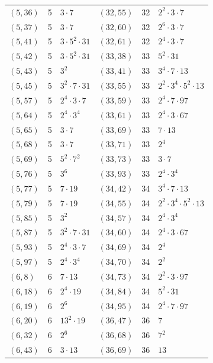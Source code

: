 \documentclass[11pt]{article}
\begin{document}
\begin{longtable}{@{}lrl@{\qquad}lrl@{}}
$(5,36)$ & 5 & $3\cdot 7$ & $(32,55)$ & 32 & $2^{2}\cdot 3\cdot 7$\\
$(5,37)$ & 5 & $3\cdot 7$ & $(32,60)$ & 32 & $2^{6}\cdot 3\cdot 7$\\
$(5,41)$ & 5 & $3\cdot 5^{2}\cdot 31$ & $(32,61)$ & 32 & $2^{4}\cdot 3\cdot 7$\\
$(5,42)$ & 5 & $3\cdot 5^{2}\cdot 31$ & $(33,38)$ & 33 & $5^{2}\cdot 31$\\
$(5,43)$ & 5 & $3^{2}$ & $(33,41)$ & 33 & $3^{4}\cdot 7\cdot 13$\\
$(5,45)$ & 5 & $3^{2}\cdot 7\cdot 31$ & $(33,55)$ & 33 & $2^{2}\cdot 3^{4}\cdot 5^{2}\cdot 13$\\
$(5,57)$ & 5 & $2^{4}\cdot 3\cdot 7$ & $(33,59)$ & 33 & $2^{4}\cdot 7\cdot 97$\\
$(5,64)$ & 5 & $2^{4}\cdot 3^{4}$ & $(33,61)$ & 33 & $2^{4}\cdot 3\cdot 67$\\
$(5,65)$ & 5 & $3\cdot 7$ & $(33,69)$ & 33 & $7\cdot 13$\\
$(5,68)$ & 5 & $3\cdot 7$ & $(33,71)$ & 33 & $2^{4}$\\
$(5,69)$ & 5 & $5^{2}\cdot 7^{2}$ & $(33,73)$ & 33 & $3\cdot 7$\\
$(5,76)$ & 5 & $3^{6}$ & $(33,93)$ & 33 & $2^{4}\cdot 3^{4}$\\
$(5,77)$ & 5 & $7\cdot 19$ & $(34,42)$ & 34 & $3^{4}\cdot 7\cdot 13$\\
$(5,79)$ & 5 & $7\cdot 19$ & $(34,55)$ & 34 & $2^{2}\cdot 3^{4}\cdot 5^{2}\cdot 13$\\
$(5,85)$ & 5 & $3^{2}$ & $(34,57)$ & 34 & $2^{4}\cdot 3^{4}$\\
$(5,87)$ & 5 & $3^{2}\cdot 7\cdot 31$ & $(34,60)$ & 34 & $2^{4}\cdot 3\cdot 67$\\
$(5,93)$ & 5 & $2^{4}\cdot 3\cdot 7$ & $(34,69)$ & 34 & $2^{4}$\\
$(5,97)$ & 5 & $2^{4}\cdot 3^{4}$ & $(34,70)$ & 34 & $2^{2}$\\
$(6,8)$ & 6 & $7\cdot 13$ & $(34,73)$ & 34 & $2^{2}\cdot 3\cdot 97$\\
$(6,18)$ & 6 & $2^{4}\cdot 19$ & $(34,84)$ & 34 & $5^{2}\cdot 31$\\
$(6,19)$ & 6 & $2^{6}$ & $(34,95)$ & 34 & $2^{4}\cdot 7\cdot 97$\\
$(6,20)$ & 6 & $13^{2}\cdot 19$ & $(36,47)$ & 36 & $7$\\
$(6,32)$ & 6 & $2^{6}$ & $(36,68)$ & 36 & $7^{2}$\\
$(6,43)$ & 6 & $3\cdot 13$ & $(36,69)$ & 36 & $13$\\

\end{longtable}
\end{document}
